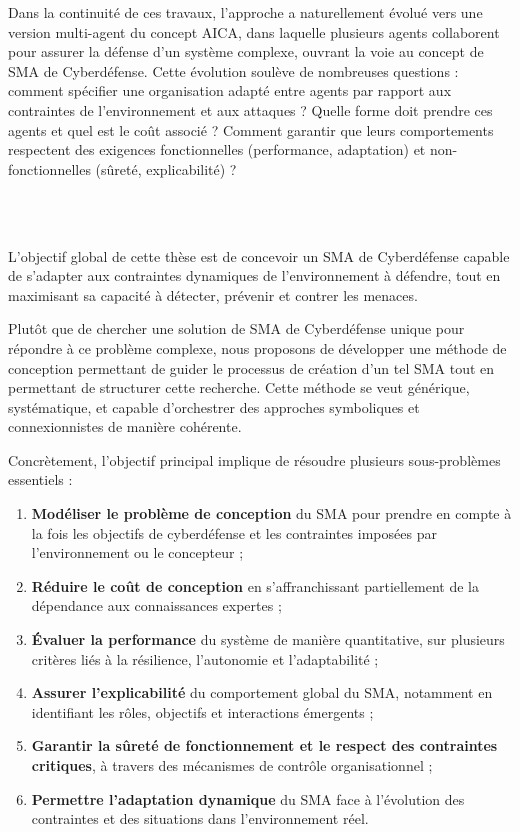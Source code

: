 \documentclass[ twoside,openright,titlepage,numbers=noenddot,headinclude,%
                footinclude=true,cleardoublepage=empty,abstractoff, %
                BCOR=5mm,paper=a4,fontsize=11pt,%
                french,american,%
                ]{scrreprt}
\begin{document}
Dans la continuité de ces travaux, l'approche a naturellement évolué vers une version multi-agent du concept AICA, dans laquelle plusieurs agents collaborent pour assurer la défense d'un système complexe, ouvrant la voie au concept de SMA de Cyberdéfense. Cette évolution soulève de nombreuses questions : comment spécifier une organisation adapté entre agents par rapport aux contraintes de l'environnement et aux attaques ? Quelle forme doit prendre ces agents et quel est le coût associé ? Comment garantir que leurs comportements respectent des exigences fonctionnelles (performance, adaptation) et non-fonctionnelles (sûreté, explicabilité) ?

\

\bigskip

\\

L'objectif global de cette thèse est de concevoir un SMA de Cyberdéfense capable de s'adapter aux contraintes dynamiques de l'environnement à défendre, tout en maximisant sa capacité à détecter, prévenir et contrer les menaces.

Plutôt que de chercher une solution de SMA de Cyberdéfense unique pour répondre à ce problème complexe, nous proposons de développer une méthode de conception permettant de guider le processus de création d'un tel SMA tout en permettant de structurer cette recherche. Cette méthode se veut générique, systématique, et capable d'orchestrer des approches symboliques et connexionnistes de manière cohérente.

Concrètement, l'objectif principal implique de résoudre plusieurs sous-problèmes essentiels :
\begin{enumerate}
    \item \textbf{Modéliser le problème de conception} du SMA pour prendre en compte à la fois les objectifs de cyberdéfense et les contraintes imposées par l'environnement ou le concepteur ;
    \item \textbf{Réduire le coût de conception} en s'affranchissant partiellement de la dépendance aux connaissances expertes ;
    \item \textbf{Évaluer la performance} du système de manière quantitative, sur plusieurs critères liés à la résilience, l'autonomie et l'adaptabilité ;
    \item \textbf{Assurer l'explicabilité} du comportement global du SMA, notamment en identifiant les rôles, objectifs et interactions émergents ;
    \item \textbf{Garantir la sûreté de fonctionnement et le respect des contraintes critiques}, à travers des mécanismes de contrôle organisationnel ;
    \item \textbf{Permettre l'adaptation dynamique} du SMA face à l'évolution des contraintes et des situations dans l'environnement réel.
\end{enumerate}
\end{document}
